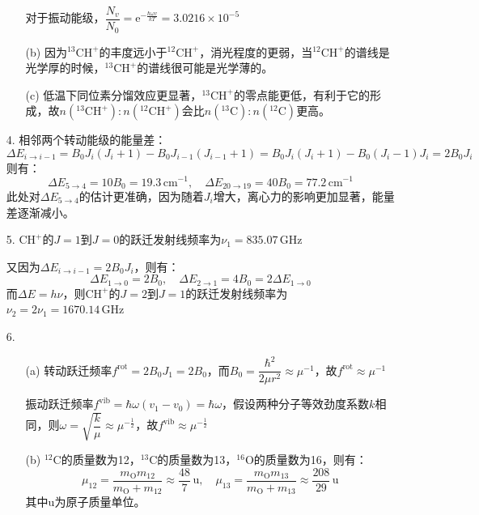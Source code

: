 \documentclass[a4paper]{article}
\begin{document}
\begin{enumerate}
\begin{enumerate}
        对于振动能级，$\dfrac{N_v}{N_0} = \mathrm{e}^{-\tfrac{\hbar\omega v}{kT}} = 3.0216\times10^{-5}$

        \item[(b)]
        因为$^{13}\mathrm{CH}^+$的丰度远小于$^{12}\mathrm{CH}^+$，消光程度的更弱，当$^{12}\mathrm{CH}^+$的谱线是光学厚的时候，$^{13}\mathrm{CH}^+$的谱线很可能是光学薄的。

        \item[(c)]
        低温下同位素分馏效应更显著，$^{13}\mathrm{CH}^+$的零点能更低，有利于它的形成，故$n(^{13}\mathrm{CH}^+):n(^{12}\mathrm{CH}^+)$会比$n(^{13}\mathrm{C}):n(^{12}\mathrm{C})$更高。
    \end{enumerate}

    \bigskip
    \item[4.]
    相邻两个转动能级的能量差：
    \[
        \Delta E_{i \to i-1} = B_0J_i(J_i + 1) - B_0J_{i-1}(J_{i-1} + 1) = B_0J_i(J_i + 1) - B_0(J_i - 1)J_i = 2B_0 J_i
    \]
    则有：
    \[
        \Delta E_{5 \to 4} = 10B_0 = 19.3\,\mathrm{cm}^{-1},\quad
        \Delta E_{20 \to 19} = 40B_0 = 77.2\,\mathrm{cm}^{-1}
    \]
    此处对$\Delta E_{5 \to 4}$的估计更准确，因为随着$J_i$增大，离心力的影响更加显著，能量差逐渐减小。

    \bigskip
    \item[5.]
    $\mathrm{CH}^+$的$J=1$到$J=0$的跃迁发射线频率为$\nu_1=835.07\,\mathrm{GHz}$

    又因为$\Delta E_{i \to i-1} = 2B_0 J_i$，则有：
    \[
        \Delta E_{1 \to 0} = 2B_0,\quad
        \Delta E_{2 \to 1} = 4B_0 = 2\Delta E_{1 \to 0}
    \]
    而$\Delta E = h\nu$，则$\mathrm{CH}^+$的$J=2$到$J=1$的跃迁发射线频率为$\nu_2=2\nu_1=1670.14\,\mathrm{GHz}$

    \bigskip
    \item[6.]
    \begin{enumerate}
        \item[(a)]
        转动跃迁频率$f^\mathrm{rot} = 2B_0 J_1 = 2B_0$，而$B_0 = \dfrac{\hbar^2}{2\mu r^2} \approx \mu^{-1}$，故$f^\mathrm{rot} \approx \mu^{-1}$

        振动跃迁频率$f^\mathrm{vib} = \hbar\omega(v_1 - v_0) = \hbar\omega$，假设两种分子等效劲度系数$k$相同，则$\omega = \sqrt{\dfrac{k}{\mu}} \approx \mu^{-\tfrac{1}{2}}$，故$f^\mathrm{vib} \approx \mu^{-\tfrac{1}{2}}$

        \item[(b)]
        $^{12}\mathrm{C}$的质量数为12，$^{13}\mathrm{C}$的质量数为13，$^{16}\mathrm{O}$的质量数为16，则有：
        \[
            \mu_{12} = \frac{m_\mathrm{O} m_{12}}{m_\mathrm{O} + m_{12}} \approx \frac{48}{7}\,\mathrm{u},\quad
            \mu_{13} = \frac{m_\mathrm{O} m_{13}}{m_\mathrm{O} + m_{13}} \approx \frac{208}{29}\,\mathrm{u}
        \]
        其中$\mathrm{u}$为原子质量单位。


\end{enumerate}
\end{enumerate}
\end{document}
